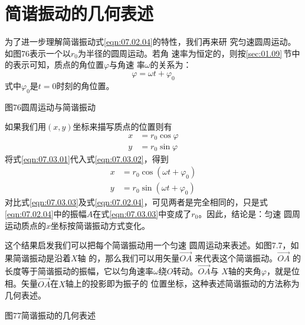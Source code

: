 \section{简谐振动的几何表述}\label{sec:07.03}

为了进一步理解简谐振动\lhbrak 式\eqref{eqn:07.02.04}\rhbrak 的特性，我们再来研
究匀速圆周运动。如图76表示一个以$ r _ { 0 } $为半径的圆周运动。若角
速率为恒定的，则按\ref{sec:01.09}\,节中的表示可知，质点的角位置$ \varphi $与角速
率$ \omega $的关系为：
\begin{equation}\label{eqn:07.03.01}
	\varphi = \omega t + \varphi _ { 0 }
\end{equation}
式中$ \varphi _ { 0 } $是$  t = 0   $时刻的角位置。

图76圆周运动与简谐振动

如果我们用$ (x, y) $坐标来描写质点的位置则有
\begin{equation}\label{eqn:07.03.02}
	\begin{aligned}
	x &= r _ { 0 } \cos \varphi  \\
	y &= r _ { 0 } \sin \varphi
	\end{aligned}
\end{equation}
将式\eqref{eqn:07.03.01}代入式\eqref{eqn:07.03.02}，得到
\begin{equation}\label{eqn:07.03.03}
    \begin{aligned}
    x &= r _ { 0 } \cos ( \omega t + \varphi _ { 0 } ) \\
    y &= r _ { 0 } \sin ( \omega t + \varphi _ { 0 } )
\end{aligned}
\end{equation}
对比式\eqref{eqn:07.03.03}及式\eqref{eqn:07.02.04}，可见两者是完全相同的，只是式
\eqref{eqn:07.02.04}中的振幅$ A $在式\eqref{eqn:07.03.03}中变成了$ r _ { 0 } $。因此，结论是：匀速
圆周运动质点的$ x $坐标按简谐振动方式变化。

这个结果启发我们可以把每个简谐振动用一个匀速
圆周运动来表述。如图7.7，如果简谐振动是沿着$ X $轴
的，那么我们可以用矢量$ \vec{ OA } $
来代表这个简谐振动。$ \vec{ OA } $
的长度等于简谐振动的振幅，它以匀角速率$ \omega $绕$ O $转动。$ \vec{ OA } $与
$ X $轴的夹角$ \varphi $，就是位相。矢量$ \vec{ OA } $在$ X $轴上的投影即为振子的
位置坐标，这种表述简谐振动的方法称为几何表述。

图77简谐振动的几何表述